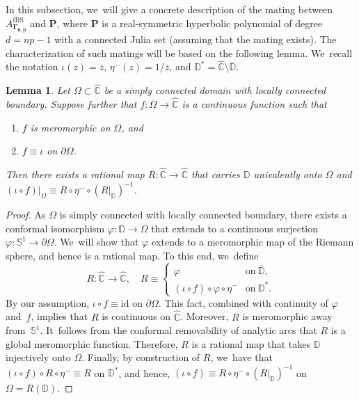 \documentclass[JEP,XML,SOM,Unicode,NoFloatCountersInSection,published]{cedram}
\newtheorem{lemma}{Lemma}[section]
\theoremstyle{definition}
\theoremstyle{remark}
\newcommand{\C}{\mathbb{C}}
\newcommand{\D}{\mathbb{D}}
\let\phi\varphi
\begin{document}
\label{real_sym_mating_subsec}

In this subsection, we~will give a concrete description of the mating between $A_{\pmb{\Gamma_{n,p}}}^{\mathrm{fBS}}$ and $\pmb{P}$, where $\pmb{P}$ is a real-symmetric hyperbolic polynomial of degree $d=np-1$ with a connected Julia set (assuming that the mating exists).
The characterization of such matings will be based on the following lemma. We~recall the notation $\iota(z)=\overline{z}$, $\eta^{-}(z)=1/\overline{z}$, and $\D^*= \widehat{\C}\setminus\overline{\D}$.

\begin{lemma}\label{qd_lem}
Let $\Omega\subset\widehat{\C}$ be a simply connected domain with locally connected boundary. Suppose further that $f:\overline{\Omega}\to\widehat{\C}$ is a continuous function such that
\begin{enumerate}
\item $f$ is meromorphic on $\Omega$, and
\item $f\equiv \iota$ on $\partial\Omega$.
\end{enumerate}
Then there exists a rational map $R:\widehat{\C}\to\widehat{\C}$ that carries $\D$ univalently onto $\Omega$ and $\left(\iota\circ f\right)\vert_{\Omega}\equiv R\circ\eta^-\circ\left(R\vert_{\D}\right)^{-1}$.
\end{lemma}
\begin{proof}
As $\Omega$ is simply connected with locally connected boundary, there exists a conformal isomorphism $\phi:\D\!\to\!\Omega$ that extends to a continuous surjection $\phi:\mathbb{S}^1\!\to\!\partial\Omega$. We~will show that $\phi$ extends to a meromorphic map of the Riemann sphere, and hence is a rational map. To this end, we~define\vspace*{-3pt}
\[
R:\widehat{\C}\to\widehat{\C},\quad R\equiv
\begin{cases}
\phi& \text{on}\ \overline{\D},\\
\left(\iota \circ f\right) \circ \phi \circ \eta^-& \text{on}\ \D^*.
\end{cases}
\]
By our assumption, $\iota\circ f\equiv \mathrm{id}$ on $\partial\Omega$. This fact, combined with continuity of $\phi$ and~$f$, implies that $R$ is continuous on $\widehat{\C}$. Moreover, $R$ is meromorphic away from~$\mathbb{S}^1$. It~follows from the conformal removability of analytic arcs that $R$ is a global meromorphic function. Therefore, $R$ is a rational map that takes $\D$ injectively onto $\Omega$. Finally, by construction of $R$, we~have that $(\iota\circ f)\circ R\circ \eta^-\equiv R$ on $\D^*$, and hence, $\left(\iota\circ f\right)\equiv R\circ\eta^-\circ\left(R\vert_{\D}\right)^{-1}$ on $\Omega=R(\D)$.
\end{proof}
\end{document}
